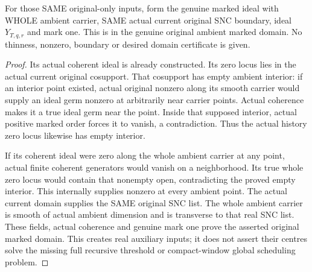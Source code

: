 \begin{theorem}
\label{hir:original-global-companion-history-year-actual-marked-domain}
\leanok
{}
For those SAME original-only inputs, form the genuine marked ideal with WHOLE
ambient carrier, SAME actual current original SNC boundary, ideal $Y_{T,q,r}$
and mark one. This is in the genuine original ambient marked domain. No thinness,
nonzero, boundary or desired domain certificate is given.
\end{theorem}
\begin{proof}
Its actual coherent ideal is already constructed. Its zero locus lies in the
actual current original cosupport. That cosupport has empty ambient interior:
if an interior point existed, actual original nonzero along its smooth carrier
would supply an ideal germ nonzero at arbitrarily near carrier points. Actual
coherence makes it a true ideal germ near the point. Inside that supposed
interior, actual positive marked order forces it to vanish, a contradiction.
Thus the actual history zero locus likewise has empty interior.

If its coherent ideal were zero along the whole ambient carrier at any point,
actual finite coherent generators would vanish on a neighborhood. Its true
whole zero locus would contain that nonempty open, contradicting the proved
empty interior. This internally supplies nonzero at every ambient point.
The actual current domain supplies the SAME original SNC list. The whole
ambient carrier is smooth of actual ambient dimension and is transverse to
that real SNC list. These fields, actual coherence and genuine mark one prove
the asserted original marked domain. This creates real auxiliary inputs; it
does not assert their centres solve the missing full recursive threshold or
compact-window global scheduling problem.
\end{proof}

